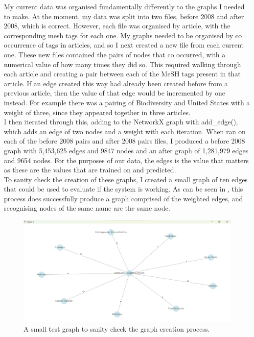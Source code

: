 \documentclass{l4proj}
\begin{document}
My current data was organised fundamentally differently to the graphs I needed to make. At the moment, my data was split into two files, before 2008 and after 2008, which is correct. However, each file was organised by article, with the corresponding mesh tags for each one. My graphs needed to be organised by co occurrence of tags in articles, and so I next created a new file from each current one. These new files contained the pairs of nodes that co occurred, with a numerical value of how many times they did so. This required walking through each article and creating a pair between each of the MeSH tags present in that article. If an edge created this way had already been created before from a previous article, then the value of that edge would be incremented by one instead. For example there was a pairing of Biodiversity and United States with a weight of three, since they appeared together in three articles. \\

I then iterated through this, adding to the NetworkX graph with add\_edge(),  which adds an edge of two nodes and a weight with each iteration. When ran on each of the before 2008 pairs and after 2008 pairs files, I produced a before 2008 graph with 5,453,625 edges and 9847 nodes and an after graph of 1,281,979 edges and 9654 nodes. For the purposes of our data, the edges is the value that matters as these are the values that are trained on and predicted. \\

To sanity check the creation of these graphs, I created a small graph of ten edges that could be used to evaluate if the system is working. As can be seen in , this process does successfully produce a graph comprised of the weighted edges, and recognising nodes of the same name are the same node. \\

\begin{figure}[h]
    \centering
    \includegraphics[width=\linewidth]{images/test_graph_creation.png}
    \caption{A small test graph to sanity check the graph creation process.}
    \label{fig:test_graph_creation}
\end{figure}
\end{document}
